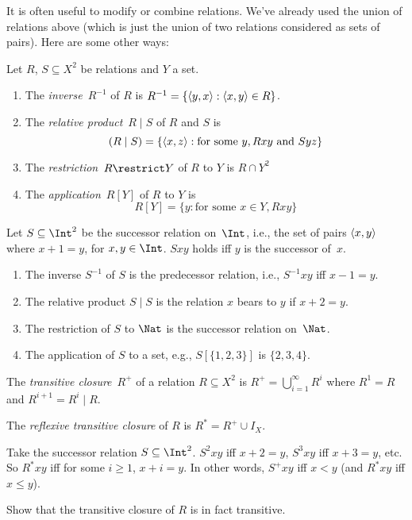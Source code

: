 \documentclass[../../../include/open-logic-section]{subfiles}
\begin{document}

It is often useful to modify or combine relations. We've already used
the union of relations above (which is just the union of two relations
considered as sets of pairs). Here are some other ways:

\begin{defn} Let $R$, $S \subseteq X^2$ be relations and $Y$ a set.
\begin{enumerate}
\item The \emph{inverse}~$R^{-1}$ of $R$ is $R^{-1} = \{ \langle y,
    x \rangle : \langle x, y \rangle \in R \}$.
\item The \emph{relative product}~$R \mid S$ of $R$ and $S$ is
\[
(R \mid S) = \{\langle x, z \rangle : \text{for some } y, Rxy \text{ and } Syz\}
\]
\item The \emph{restriction}~$R \restrict Y$ of $R$ to $Y$ is $R \cap Y^2$
\item The \emph{application}~$R[Y]$ of $R$ to $Y$ is
\[
R[Y] = \{y : \text{for some } x \in Y, Rxy\}
\]
\end{enumerate}
\end{defn}

\begin{ex}
Let $S \subseteq \Int^2$ be the successor relation on~$\Int$, i.e.,
the set of pairs $\langle x, y \rangle$ where $x + 1 = y$, for $x, y \in
\Int$. $Sxy$ holds iff $y$ is the successor of~$x$.
\begin{enumerate}
\item The inverse $S^{-1}$ of $S$ is the predecessor relation, i.e.,
  $S^{-1}xy$ iff $x-1 = y$.
\item The relative product $S\mid S$ is the relation $x$ bears to $y$
  if $x+2 = y$.
\item The restriction of $S$ to $\Nat$ is the successor relation
  on~$\Nat$.
\item The application of $S$ to a set, e.g., $S[\{1, 2, 3\}]$ is $\{2,
  3, 4\}$.
\end{enumerate}

\end{ex}

\begin{defn}
The \emph{transitive closure}~$R^+$ of a relation $R \subseteq X^2$ is
$R^+ = \bigcup_{i=1}^\infty R^i$ where $R^1 = R$ and $R^{i+1} = R^i
\mid R$.

The \emph{reflexive transitive closure} of $R$ is $R^* = R^+ \cup
I_X$.
\end{defn}

\begin{ex}
Take the successor relation $S \subseteq \Int^2$. $S^2xy$ iff $x + 2 =
y$, $S^3xy$ iff $x + 3 = y$, etc. So $R^*xy$ iff for some $i \ge 1$,
$x + i = y$. In other words, $S^+xy$ iff $x < y$ (and $R^*xy$ iff $x
\le y$).
\end{ex}

\begin{prob}
Show that the transitive closure of $R$ is in fact transitive.
\end{prob}
\end{document}
